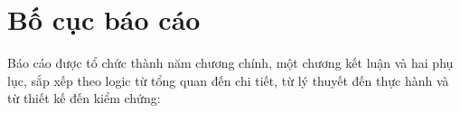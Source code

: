 \documentclass[../DoAn.tex]{subfiles}
\begin{document}








\section{Bố cục báo cáo}
\label{section:1.6}

Báo cáo được tổ chức thành năm chương chính, một chương kết luận và hai phụ lục, sắp xếp
theo logic từ tổng quan đến chi tiết, từ lý thuyết đến thực hành và từ thiết kế đến kiểm chứng:
\end{document}
